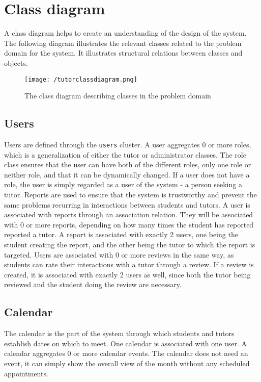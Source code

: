 \section{Class diagram}
A class diagram helps to create an understanding of the design of the system.
The following diagram illustrates the relevant classes related to the problem domain for the system.
It illustrates structural relations between classes and objects\cite{OOAD}.

\begin{figure}[H]
    \texttt{[image: /tutorclassdiagram.png]}
     \caption{The class diagram describing classes in the problem domain}
     \label{fig:class-diagram}
 \end{figure}

\subsection{Users}
Users are defined through the \texttt{users} cluster.
A user aggregates 0 or more roles, which is a generalization of either the tutor or administrator classes.
The role class ensures that the user can have both of the different roles, only one role or neither role, and that it can be dynamically changed.
If a user does not have a role, the user is simply regarded as a user of the system - a person seeking a tutor.
Reports are used to ensure that the system is trustworthy and prevent the same problems recurring in interactions between students and tutors.
A user is associated with reports through an association relation.
They will be associated with 0 or more reports, depending on how many times the student has reported reported a tutor.
A report is associated with exactly 2 users, one being the student creating the report, and the other being the tutor to which the report is targeted.
Users are associated with 0 or more reviews in the same way, as students can rate their interactions with a tutor through a review.
If a review is created, it is associated with exactly 2 users as well, since both the tutor being reviewed and the student doing the review are necessary.

\subsection{Calendar}
The calendar is the part of the system through which students and tutors establish dates on which to meet.
One calendar is associated with one user.
A calendar aggregates 0 or more calendar events.
The calendar does not need an event, it can simply show the overall view of the month without any scheduled appointments.

